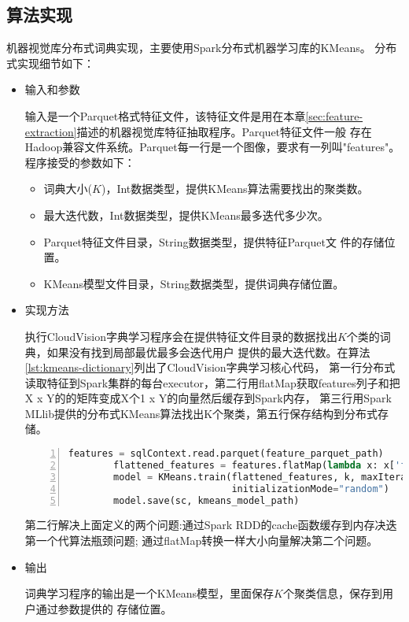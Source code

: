 \subsection*{算法实现}
机器视觉库分布式词典实现，主要使用Spark分布式机器学习库的KMeans。
分布式实现细节如下：
\begin{itemize}
  \item 输入和参数

        输入是一个Parquet格式特征文件，该特征文件是用在本章\ref{sec:feature-extraction}描述的机器视觉库特征抽取程序。Parquet特征文件一般
        存在Hadoop兼容文件系统。Parquet每一行是一个图像，要求有一列叫"features"。
        程序接受的参数如下：
        \begin{itemize}
          \item 词典大小($K$)，Int数据类型，提供KMeans算法需要找出的聚类数。
          \item 最大迭代数，Int数据类型，提供KMeans最多迭代多少次。
          \item Parquet特征文件目录，String数据类型，提供特征Parquet文
                件的存储位置。
          \item KMeans模型文件目录，String数据类型，提供词典存储位置。
        \end{itemize}

  \item 实现方法

        执行CloudVision字典学习程序会在提供特征文件目录的数据找出$K$个类的词典，如果没有找到局部最优最多会迭代用户
        提供的最大迭代数。在算法\ref{lst:kmeans-dictionary}列出了CloudVision字典学习核心代码，
        第一行分布式读取特征到Spark集群的每台executor，第二行用flatMap获取features列子和把X x Y的的矩阵变成X个1 x Y的向量然后缓存到Spark内存，
        第三行用Spark MLlib提供的分布式KMeans算法找出K个聚类，第五行保存结构到分布式存储。
        \begin{lstlisting}[language=Python,
                           basicstyle=\small,
                           showstringspaces=false,
                           numbers=left,
                           caption={词典学习核心代码},
                           label={lst:kmeans-dictionary}]
        features = sqlContext.read.parquet(feature_parquet_path)
        flattened_features = features.flatMap(lambda x: x['features']).cache()
        model = KMeans.train(flattened_features, k, maxIterations=maxIter,
                             initializationMode="random")
        model.save(sc, kmeans_model_path)
        \end{lstlisting}
        第二行解决上面定义的两个问题:通过Spark RDD的cache函数缓存到内存决迭第一个代算法瓶颈问题;
        通过flatMap转换一样大小向量解决第二个问题。


  \item 输出

        词典学习程序的输出是一个KMeans模型，里面保存$K$个聚类信息，保存到用户通过参数提供的
        存储位置。
\end{itemize}



